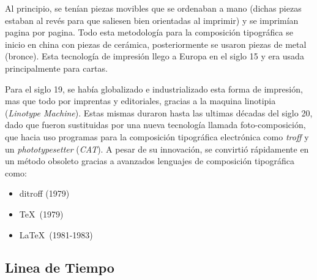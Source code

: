 \documentclass[12pt,letterpaper,titlepage,oneside,openright]{book}
\begin{document}
Al principio, se tenían piezas movibles que se ordenaban a mano (dichas piezas estaban al revés 
para que saliesen bien orientadas al imprimir) y se imprimían pagina por pagina. Todo esta 
metodología para la composición tipográfica se inicio en china con piezas de cerámica, 
posteriormente se usaron piezas de metal (bronce). Esta tecnología de impresión llego a Europa
en el siglo 15 y era usada principalmente para cartas.

Para el siglo 19, se había globalizado e industrializado esta forma de impresión, mas que todo por
imprentas y editoriales, gracias a la maquina linotipia (\textit{Linotype Machine}). Estas mismas duraron hasta las ultimas décadas del siglo 20, dado que fueron sustituidas por una nueva tecnología llamada foto-composición, que hacia uso programas para la composición tipográfica electrónica como \textit{troff} y un \textit{phototypesetter} (\textit{CAT}).  A pesar de su innovación, se convirtió rápidamente en un método obsoleto gracias a avanzados lenguajes de composición tipográfica como:

\begin{itemize}
\item ditroff (1979)
\item \TeX \ (1979)
\item \LaTeX \ (1981-1983)
\end{itemize}

\subsection{Linea de Tiempo}
\end{document}
